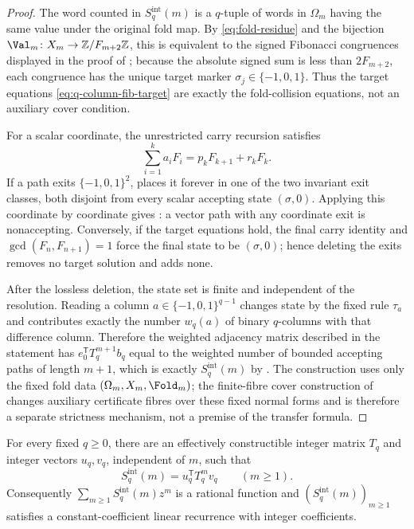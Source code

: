 \begin{proof}
The word counted in \(S_q^{\mathrm{int}}(m)\) is a \(q\)-tuple of words in
\(\Omega_m\) having the same value under the original fold map.  By
\eqref{eq:fold-residue} and the bijection \(\Val_m\colon X_m\to
\mathbb Z/F_{m+2}\mathbb Z\), this is equivalent to the signed Fibonacci
congruences displayed in the proof of ;
because the absolute signed sum is less than \(2F_{m+2}\), each congruence has the
unique target marker \(\sigma_j\in\{-1,0,1\}\).  Thus the target equations
\eqref{eq:q-column-fib-target} are exactly the fold-collision equations, not an
auxiliary cover condition.

For a scalar coordinate, the unrestricted carry recursion satisfies
\[
  \sum_{i=1}^k a_iF_i=p_kF_{k+1}+r_kF_k .
\]
If a path exits \(\{-1,0,1\}^2\),
 places it forever in one
of the two invariant exit classes, both disjoint from every scalar accepting
state \((\sigma,0)\).  Applying this coordinate by coordinate gives
: a vector path with any
coordinate exit is nonaccepting.  Conversely, if the target equations hold, the
final carry identity and \(\gcd(F_n,F_{n+1})=1\) force the final state to be
\((\sigma,0)\); hence deleting the exits removes no target solution and adds none.

After the lossless deletion, the state set is finite and independent of the
resolution.  Reading a column \(a\in\{-1,0,1\}^{q-1}\) changes state by the fixed
rule \(\tau_a\) and contributes exactly the number \(w_q(a)\) of binary
\(q\)-columns with that difference column.  Therefore the weighted adjacency
matrix described in the statement has
\(e_0^{\mathsf T}T_q^{m+1}b_q\) equal to the weighted number of bounded
accepting paths of length \(m+1\), which is exactly
\(S_q^{\mathrm{int}}(m)\) by
.
The construction uses only the fixed fold data \((\Omega_m,X_m,\Fold_m)\); the
finite-fibre cover construction of  changes
auxiliary certificate fibres over these fixed normal forms and is therefore a
separate strictness mechanism, not a premise of the transfer formula.
\end{proof}

\begin{theorem}
\label{thm:intrinsic-fold-moment-transfer}
For every fixed \(q\ge0\), there are an effectively constructible integer matrix
\(T_q\) and integer vectors \(u_q,v_q\), independent of \(m\), such that
\[
  S_q^{\mathrm{int}}(m)=u_q^{\mathsf T}T_q^m v_q
  \qquad(m\ge1).
\]
Consequently \(\sum_{m\ge1}S_q^{\mathrm{int}}(m)z^m\) is a rational function and
\((S_q^{\mathrm{int}}(m))_{m\ge1}\) satisfies a constant-coefficient linear
recurrence with integer coefficients.
\end{theorem}

